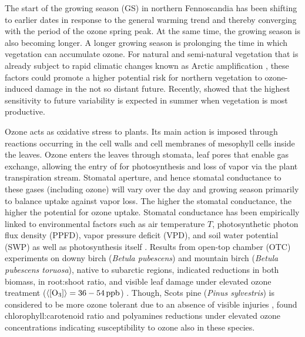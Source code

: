 \documentclass[bg, manuscript]{copernicus}
\begin{document}
The start of the growing season (GS) in northern Fennoscandia has been shifting to earlier dates in response to the general warming trend \citep[e.g.]{GCB:Menzel2006,RS:Hogda2013,IJB:Karlsen2007} and thereby converging with the period of the ozone spring peak. At the same time, the growing season is also becoming longer. A longer growing season is prolonging the time in which vegetation can accumulate ozone. For natural and semi-natural vegetation that is already subject to rapid climatic changes known as Arctic amplification \citep{AMAP2012,IPCC2013}, these factors could promote a higher potential risk for northern vegetation to ozone-induced damage in the not so distant future. Recently, \citet{ESPR:Hayes2021} showed that the highest sensitivity to future \chem{[O_3]} variability is expected in summer when vegetation is most productive.

Ozone acts as oxidative stress to plants. Its main action is imposed through reactions occurring in the cell walls and cell membranes of mesophyll cells inside the leaves. Ozone enters the leaves through stomata, leaf pores that enable gas exchange, allowing the entry of  for photosynthesis and loss of  vapor via the plant transpiration stream. Stomatal aperture, and hence stomatal conductance to these gases (including ozone) will vary over the day and growing season primarily to balance  uptake against  vapor loss. The higher the stomatal conductance, the higher the potential for ozone uptake. Stomatal conductance has been empirically linked to environmental factors such as air temperature $T$, photosynthetic photon flux density (PPFD), vapor pressure deficit (VPD), and soil water potential (SWP) as well as photosynthesis itself \cite[e.g.]{PTRS:Jarvis1976, BallBerry1987, Emberson2000, ICP:MappingManual2017}. Results from open-top chamber (OTC) experiments on downy birch (\emph{Betula pubescens}) and mountain birch (\emph{Betula pubescens toruosa}), native to subarctic regions, indicated reductions in both biomass, in root:shoot ratio, and visible leaf damage under elevated ozone treatment ($\left<\chem{[O_3]}\right> = 36-54\,\unit{ppb}$) \citep{Amb:Manninen2009}. Though, Scots pine (\emph{Pinus sylvestris}) is considered to be more ozone tolerant due to an absence of visible injuries \citep{Amb:Girgzdiene2009}, \citet{Amb:Manninen2009} found chlorophyll:carotenoid ratio and polyamines reductions under elevated ozone concentrations indicating susceptibility to ozone also in these species.\\
\end{document}
